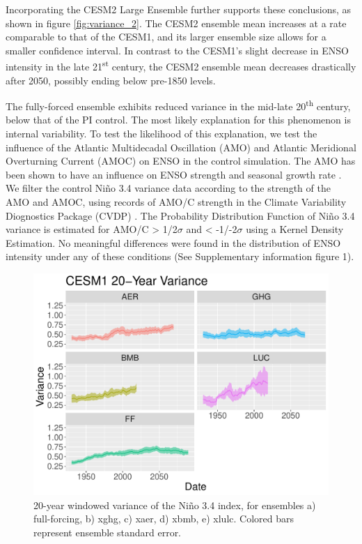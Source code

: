 \documentclass[11pt]{article}
\begin{document}
Incorporating the CESM2 Large Ensemble further supports these conclusions, as shown in figure \ref{fig:variance_2}. The CESM2 ensemble mean increases at a rate comparable to that of the CESM1, and its larger ensemble size allows for a smaller confidence interval. In contrast to the CESM1's slight decrease in ENSO intensity in the late 21\textsuperscript{st} century, the CESM2 ensemble mean decreases drastically after 2050, possibly ending below pre-1850 levels.

The fully-forced ensemble exhibits reduced variance in the mid-late 20\textsuperscript{th} century, below that of the PI control. The most likely explanation for this phenomenon is internal variability. To test the likelihood of this explanation, we test the influence of the Atlantic Multidecadal Oscillation (AMO) and Atlantic Meridional Overturning Current (AMOC) on ENSO in the control simulation. The AMO has been shown to have an influence on ENSO strength and seasonal growth rate \citep{levine2017impact}. We filter the control Niño 3.4 variance data according to the strength of the AMO and AMOC, using records of AMO/C strength in the Climate Variability Diognostics Package (CVDP) \citep{phillips2014evaluating}. The Probability Distribution Function of Niño 3.4 variance is estimated for AMO/C > 1/2\(\sigma\) and < -1/-2\(\sigma\) using a Kernel Density Estimation. No meaningful differences were found in the distribution of ENSO intensity under any of these conditions (See Supplementary information figure 1).

\begin{figure}
\centering
\includegraphics[width=.5\linewidth]{../../data/figures/cesm1.pdf}
\caption{\label{fig:variance_1}20-year windowed variance of the Niño 3.4 index, for ensembles a) full-forcing, b) xghg, c) xaer, d) xbmb, e) xlulc. Colored bars represent ensemble standard error.}
\end{figure}
\end{document}
